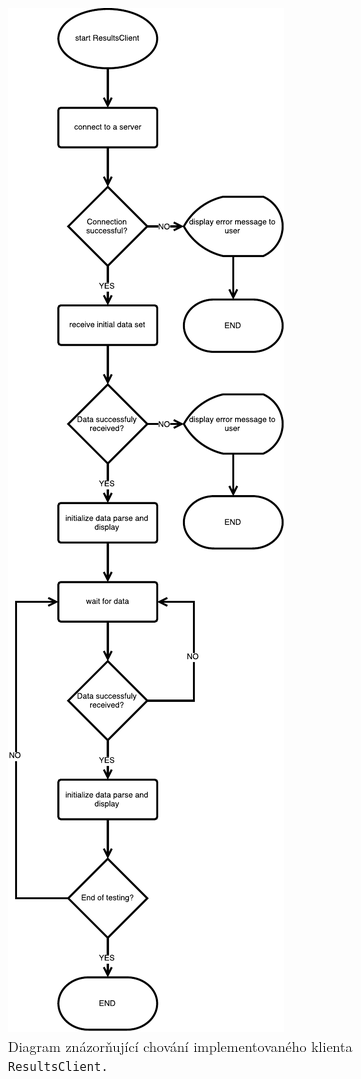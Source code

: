      \begin{figure}[h]
	  \includegraphics[width=\textwidth, height=0.95\textheight, keepaspectratio, center]{obrazky-figures/trview_resultsclient_flowchart.pdf}
	  \caption{Diagram znázorňující chování implementovaného klienta \texttt{ResultsClient.}}
	  \label{fig:resultsclient_flowchart}
	\end{figure}
      
